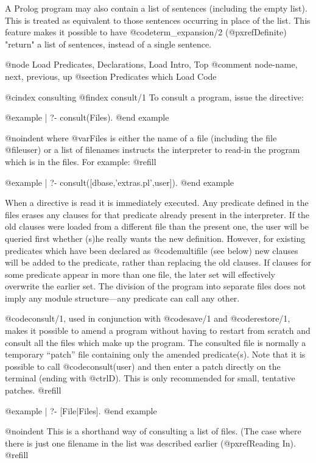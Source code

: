 A Prolog program may also contain a list of sentences (including the
empty list).  This is treated as equivalent to those sentences occurring
in place of the list.  This feature makes it possible to have
@code{term_expansion/2} (@pxref{Definite}) "return" a list of sentences,
instead of a single sentence.

@node Load Predicates, Declarations, Load Intro, Top
@comment  node-name,  next,  previous,  up
@section Predicates which Load Code

@cindex consulting
@findex consult/1
To consult a program, issue the directive:

@example
| ?- consult(Files).
@end example

@noindent
where @var{Files} is either the name of a file (including the file
@file{user}) or a list of filenames instructs the interpreter to read-in
the program which is in the files.  For example: @refill

@example
| ?- consult([dbase,'extras.pl',user]).
@end example

When a directive is read it is immediately executed.  Any predicate
defined in the files erases any clauses for that predicate already
present in the interpreter.  If the old clauses were loaded from a
different file than the present one, the user will be queried first
whether (s)he really wants the new definition.  However, for existing
predicates which have been declared as @code{multifile} (see below) new
clauses will be added to the predicate, rather than replacing the old
clauses.  If clauses for some predicate appear in more than one file,
the later set will effectively overwrite the earlier set.  The division
of the program into separate files does not imply any module
structure---any predicate can call any other.

@code{consult/1}, used in conjunction with @code{save/1} and
@code{restore/1}, makes it possible to amend a program without having to
restart from scratch and consult all the files which make up the
program.  The consulted file is normally a temporary ``patch'' file
containing only the amended predicate(s).  Note that it is possible to
call @code{consult(user)} and then enter a patch directly on the
terminal (ending with @ctrl{D}).  This is only recommended for small,
tentative patches. @refill

@example
| ?- [File|Files].
@end example

@noindent
This is a shorthand way of consulting a list of files.  (The case where
there is just one filename in the list was described earlier
(@pxref{Reading In}).  @refill

